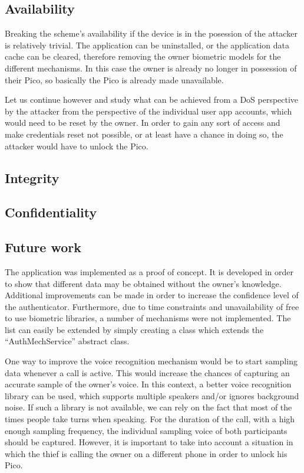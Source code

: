 \subsection*{Availability}
Breaking the scheme's availability if the device is in the posession of the attacker is relatively trivial. The application can be uninstalled, or the application data cache can be cleared, therefore removing the owner biometric models for the different mechanisms. In this case the owner is already no longer in possession of their Pico, so basically the Pico is already made unavailable.

Let us continue however and study what can be achieved from a DoS perspective by the attacker from the perspective of the individual user app accounts, which would need to be reset by the owner. In order to gain any sort of access and make credentials reset not possible, or at least have a chance in doing so, the attacker would have to unlock the Pico.

\subsection*{Integrity}
\subsection*{Confidentiality}

\subsection{Future work}
The application was implemented as a proof of concept. It is developed in order to show that different data may be obtained without the owner's knowledge. Additional improvements can be made in order to increase the confidence level of the authenticator.  Furthermore, due to time constraints and unavailability of free to use biometric libraries, a number of mechanisms were not implemented. The list can easily be extended by simply creating a class which extends the ``AuthMechService'' abstract class.

One way to improve the voice recognition mechanism would be to start sampling data whenever a call is active. This would increase the chances of capturing an accurate sample of the owner's voice. In this context, a better voice recognition library can be used, which supports multiple speakers and/or ignores background noise. If such a library is not available, we can rely on the fact that most of the times people take turns when speaking. For the duration of the call, with a high enough sampling frequency, the individual sampling voice of both participants should be captured. However, it is important to take into account a situation in which the thief is calling the owner on a different phone in order to unlock his Pico.

